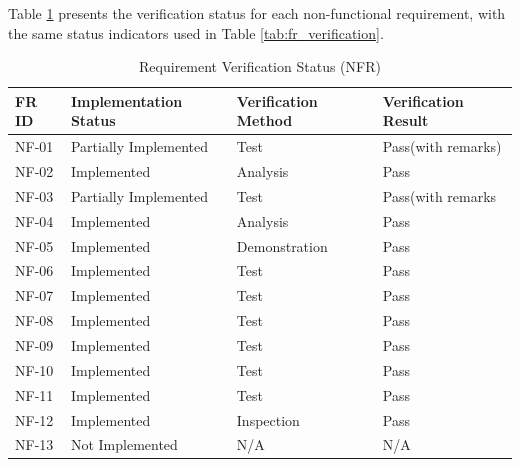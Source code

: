 \newpage
Table \ref{tab:nfr_verification} presents the verification status for each non-functional requirement, with the same status indicators used in Table \ref{tab:fr_verification}.

\begin{table}[ht]
\centering
\small
\caption{Requirement Verification Status (NFR)}
\label{tab:nfr_verification}
\renewcommand{\arraystretch}{2}
\begin{tabular}{p{1.6cm}p{4.4cm}p{4.4cm}p{4.4cm}}
    \toprule
    \textbf{FR ID} & \textbf{Implementation Status} & \textbf{Verification Method} & \textbf{Verification Result} \\
    \midrule
    NF-01 & 
    Partially Implemented &
    Test  & 
    Pass(with remarks)
      \\

    NF-02      &
    Implemented &
    Analysis   &
    Pass
       \\

    NF-03 &
    Partially Implemented &
    Test  & 
    Pass(with remarks
      \\

    NF-04      &
    Implemented &
    Analysis  &
    Pass
      \\

    NF-05      &
    Implemented &
    Demonstration  &
    Pass
      \\

    NF-06 &
    Implemented &
    Test  &
    Pass
      \\
    
    NF-07      &
    Implemented &
    Test  &
    Pass
      \\
    
    NF-08      &
    Implemented &
    Test  &
    Pass
      \\
    
    NF-09      &
    Implemented &
    Test  &
    Pass
      \\

    NF-10      &
    Implemented &
    Test  &
    Pass
        \\
    
    NF-11 &
    Implemented &
     Test  &
     Pass
       \\
    
    NF-12      &
    Implemented &
    Inspection   & 
    Pass
     \\
    
    NF-13      &
    Not Implemented &
    N/A  &
    N/A\\
    
    \bottomrule
\end{tabular}
\end{table}

